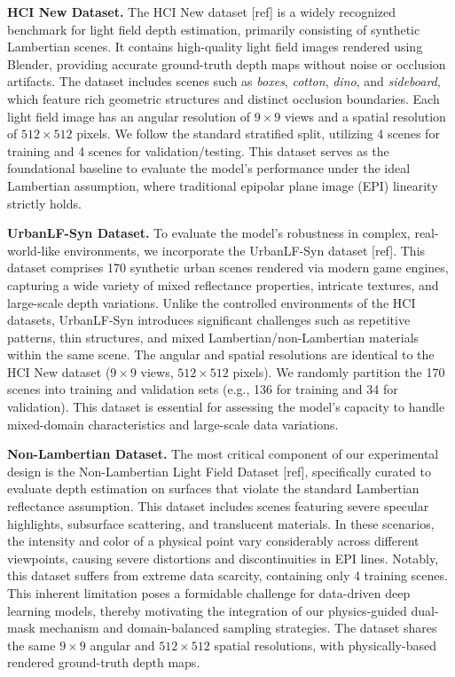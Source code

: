 \documentclass[lettersize,journal]{IEEEtran}
\begin{document}
\textbf{HCI New Dataset.} 
The HCI New dataset [ref] is a widely recognized benchmark for light field depth estimation, primarily consisting of synthetic Lambertian scenes. It contains high-quality light field images rendered using Blender, providing accurate ground-truth depth maps without noise or occlusion artifacts. The dataset includes scenes such as \textit{boxes}, \textit{cotton}, \textit{dino}, and \textit{sideboard}, which feature rich geometric structures and distinct occlusion boundaries. Each light field image has an angular resolution of $9 \times 9$ views and a spatial resolution of $512 \times 512$ pixels. We follow the standard stratified split, utilizing 4 scenes for training and 4 scenes for validation/testing. This dataset serves as the foundational baseline to evaluate the model's performance under the ideal Lambertian assumption, where traditional epipolar plane image (EPI) linearity strictly holds.

\textbf{UrbanLF-Syn Dataset.} 
To evaluate the model's robustness in complex, real-world-like environments, we incorporate the UrbanLF-Syn dataset [ref]. This dataset comprises 170 synthetic urban scenes rendered via modern game engines, capturing a wide variety of mixed reflectance properties, intricate textures, and large-scale depth variations. Unlike the controlled environments of the HCI datasets, UrbanLF-Syn introduces significant challenges such as repetitive patterns, thin structures, and mixed Lambertian/non-Lambertian materials within the same scene. The angular and spatial resolutions are identical to the HCI New dataset ($9 \times 9$ views, $512 \times 512$ pixels). We randomly partition the 170 scenes into training and validation sets (e.g., 136 for training and 34 for validation). This dataset is essential for assessing the model's capacity to handle mixed-domain characteristics and large-scale data variations.

\textbf{Non-Lambertian Dataset.} 
The most critical component of our experimental design is the Non-Lambertian Light Field Dataset [ref], specifically curated to evaluate depth estimation on surfaces that violate the standard Lambertian reflectance assumption. This dataset includes scenes featuring severe specular highlights, subsurface scattering, and translucent materials. In these scenarios, the intensity and color of a physical point vary considerably across different viewpoints, causing severe distortions and discontinuities in EPI lines. Notably, this dataset suffers from extreme data scarcity, containing only 4 training scenes. This inherent limitation poses a formidable challenge for data-driven deep learning models, thereby motivating the integration of our physics-guided dual-mask mechanism and domain-balanced sampling strategies. The dataset shares the same $9 \times 9$ angular and $512 \times 512$ spatial resolutions, with physically-based rendered ground-truth depth maps.
\end{document}
